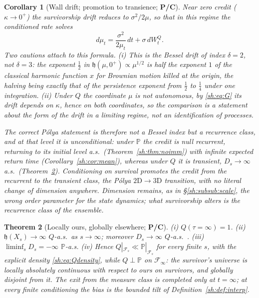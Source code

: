 \documentclass[11pt]{article}
\numberwithin{equation}{section}
\theoremstyle{plain}
\newtheorem{theorem}{Theorem}[section]
\newtheorem{corollary}[theorem]{Corollary}
\theoremstyle{definition}
\theoremstyle{remark}
\newcommand{\PP}{\mathbb{P}}
\newcommand{\Fc}{\mathcal{F}}
\newcommand{\hm}{\mathfrak{h}}
\begin{document}
\begin{corollary}[Wall drift; promotion to transience; \textbf{P/C}]
\label{sh:cor:bessel}
Near zero credit ($\kappa\to0^+$) the survivorship drift reduces to
$\sigma^2/2\mu$, so that in this regime the conditioned rate solves
\[
d\mu_t=\frac{\sigma^2}{2\mu_t}\,dt+\sigma\,dW^Q_t .
\]
Two cautions attach to this formula.
\emph{(i)} This is the Bessel drift of index $\delta=2$, not $\delta=3$:
the exponent $\tfrac12$ in $\hm(\mu,0^+)\propto\mu^{1/2}$ is half the
exponent $1$ of the classical harmonic function $x$ for Brownian motion
killed at the origin, the halving being exactly that of the persistence
exponent from $\tfrac12$ to $\tfrac14$ under one integration.
\emph{(ii)} Under $Q$ the coordinate $\mu$ is not autonomous, by
\eqref{sh:eq:G} its drift depends on $\kappa$, hence on both coordinates, so the comparison is a statement about the \emph{form} of the drift in
a limiting regime, not an identification of processes.

The correct P\'olya statement is therefore not a Bessel index but a
recurrence class, and at that level it is unconditional: under $\PP$ the
credit is null recurrent, returning to its initial level a.s.\
(Theorem~\ref{sh:thm:noimm}) with infinite expected return time
(Corollary~\ref{sh:cor:mean}), whereas under $Q$ it is transient,
$D_s\to\infty$ a.s.\ (Theorem~\ref{sh:thm:singular}). Conditioning on
survival promotes the credit from the recurrent to the transient class, the P\'olya $2\mathrm{D}\to3\mathrm{D}$ transition, with no literal
change of dimension anywhere. Dimension remains, as in
\S\ref{sh:subsub:scale}, the wrong order parameter for the state dynamics;
what survivorship alters is the recurrence class of the \emph{ensemble}.
\end{corollary}

\begin{theorem}[Locally ours, globally elsewhere; \textbf{P/C}]
\label{sh:thm:singular}
\emph{(i)} $Q(\tau=\infty)=1$.
\emph{(ii)} $\hm(X_s)\to\infty$ $Q$-a.s.\ as $s\to\infty$; moreover
$D_s\to\infty$ $Q$-a.s.\ \cite{GJW99}.
\emph{(iii)} $\liminf_sD_s=-\infty$ $\PP$-a.s.
\emph{(iv)} Hence $Q|_{\Fc_s}\ll\PP|_{\Fc_s}$ for every finite $s$, with
the explicit density \eqref{sh:eq:Qdensity}, while $Q\perp\PP$ on
$\Fc_\infty$: the survivor's universe is locally absolutely continuous
with respect to ours on survivors, and globally disjoint from it. The
exit from the measure class is completed only at $t=\infty$; at every
finite conditioning the bias is the bounded tilt of
Definition~\ref{sh:def:interp}.
\end{theorem}
\end{document}

